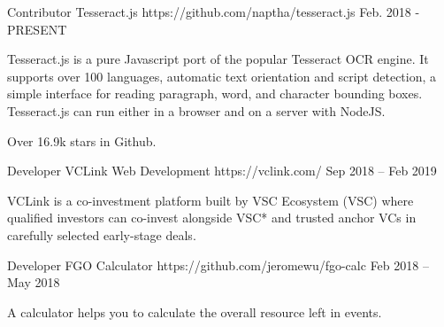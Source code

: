 

\begin{cventries}

  \cventry
    {Contributor} %
    {Tesseract.js} %
    {https://github.com/naptha/tesseract.js} %
    {Feb. 2018 - PRESENT} %
    {
      \begin{cvitems} %
        \item {Tesseract.js is a pure Javascript port of the popular Tesseract OCR engine. It supports over 100 languages, automatic text orientation and script detection, a simple interface for reading paragraph, word, and character bounding boxes. Tesseract.js can run either in a browser and on a server with NodeJS.}
        \item {Over 16.9k stars in Github.}
      \end{cvitems}
    }

  \cventry
    {Developer} %
    {VCLink Web Development} %
    {https://vclink.com/} %
    {Sep 2018 – Feb 2019} %
    {
      \begin{cvitems} %
        \item {VCLink is a co-investment platform built by VSC Ecosystem (VSC) where qualified investors can co-invest alongside VSC* and trusted anchor VCs in carefully selected early-stage deals.}
      \end{cvitems}
    }

  \cventry
    {Developer} %
    {FGO Calculator} %
    {https://github.com/jeromewu/fgo-calc} %
    {Feb 2018 – May 2018} %
    {
      \begin{cvitems} %
        \item {A calculator helps you to calculate the overall resource left in events.}
      \end{cvitems}
    }

\end{cventries}
